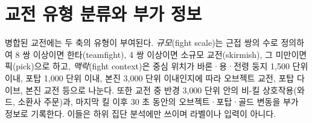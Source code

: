 
\section{교전 유형 분류와 부가 정보}
\label{sec:loc-classify}

병합된 교전에는 두 축의 유형이 부여된다. \emph{규모}(fight scale)는 근접 쌍의 수로 정의하여 8 쌍 이상이면 한타(teamfight), 4 쌍 이상이면 소규모 교전(skirmish), 그 미만이면 픽(pick)으로 하고, \emph{맥락}(fight context)은 중심 위치가 바론·용·전령 둥지 1{,}500 단위 이내, 포탑 1{,}000 단위 이내, 본진 3{,}000 단위 이내인지에 따라 오브젝트 교전, 포탑 다이브, 본진 교전 등으로 나눈다. 또한 교전 중 반경 3{,}000 단위 안의 비-킬 상호작용(와드, 소환사 주문)과, 마지막 킬 이후 30 초 동안의 오브젝트·포탑·골드 변동을 부가 정보로 기록한다. 이들은 하위 집단 분석에만 쓰이며 라벨이나 입력이 아니다.

